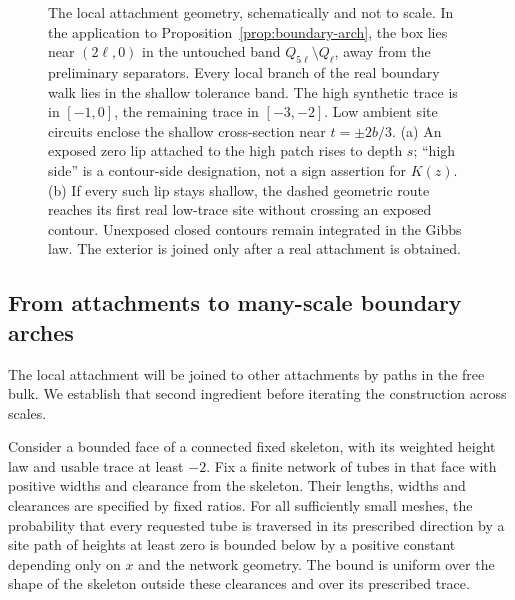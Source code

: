 \begin{figure}[!htbp]
 \centering
 
 \caption{The local attachment geometry, schematically and not to
 scale.  In the application to Proposition~\ref{prop:boundary-arch},
 the box lies near $(2\ell,0)$ in the untouched band
 $Q_{5\ell}\setminus Q_\ell$, away from the preliminary separators.
 Every local branch of the real boundary walk lies in the shallow
 tolerance band.  The high synthetic trace is in $[-1,0]$, the
 remaining trace in $[-3,-2]$.  Low ambient site circuits enclose the
 shallow cross-section near $t=\pm2b/3$.
 (a) An exposed zero lip attached to the high patch rises to depth
 $s$; ``high side'' is a contour-side designation, not a sign
 assertion for $K(z)$.
 (b) If every such lip stays shallow, the dashed geometric route
 reaches its first real low-trace site without crossing an exposed
 contour.  Unexposed closed contours remain integrated in the Gibbs
 law.  The exterior is joined only after a real attachment is obtained.}
 \label{fig:boundary-attachment}
\end{figure}
\FloatBarrier

\subsection{From attachments to many-scale boundary arches}

The local attachment will be joined to other attachments by paths in
the free bulk.  We establish that second ingredient before iterating
the construction across scales.

\begin{lemma}
\label{boundary:bulk-tubes}
Consider a bounded face of a connected fixed skeleton, with its weighted
height law and usable trace at least $-2$.  Fix a finite network of
tubes in that face with positive widths and clearance from the skeleton.
Their lengths, widths and clearances are specified by fixed ratios.
For all sufficiently small meshes, the probability that every requested
tube is traversed in its prescribed direction by a site path of heights
at least zero is bounded below by a positive constant depending only
on $x$ and the network geometry.  The bound is uniform over the shape
of the skeleton outside these clearances and over its prescribed trace.
\end{lemma}

